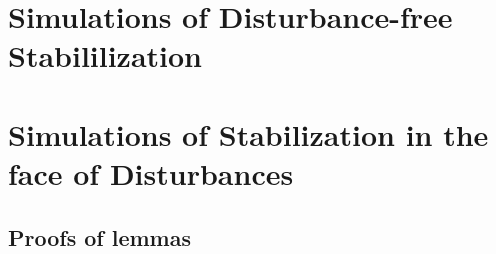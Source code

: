 \documentclass[a4paper,11pt,twoside]{book}
\begin{document}
    
    
    
    

  \chapter{Simulations of Disturbance-free Stabililization}
    \label{chapter:simulations_without_disturbances}

    
    
    
    

  \chapter{Simulations of Stabilization in the face of Disturbances}
    \label{chapter:simulations_with_disturbances}

    
    
    
    


\begin{appendices}

  \chapter{Proofs of lemmas}
    \label{chapter:proofs_of_lemmas}

    
    
    
    
    
    
    
    \cleardoublepage
\end{appendices}




\end{document}
